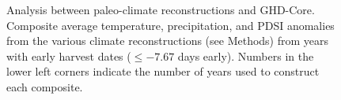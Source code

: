 \documentclass[final]{nature}
\begin{document}
\begin{figure}
\caption{Analysis between paleo-climate reconstructions and GHD-Core. Composite average temperature, precipitation, and PDSI anomalies from the various climate reconstructions (see Methods) from years with early harvest dates ($\le-7.67$ days early). Numbers in the lower left corners indicate the number of years used to construct each composite.}
\end{figure}

\end{document}
